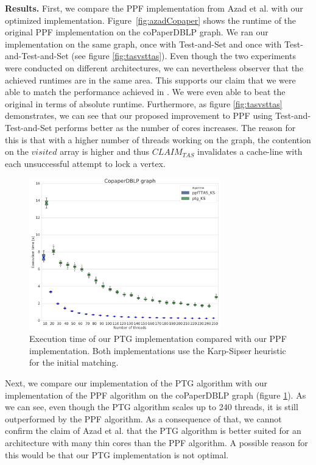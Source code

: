 \documentclass[letterpaper]{article}
\newcommand{\mypar}[1]{{\bf #1.}}
\begin{document}
\mypar{Results} First, we compare the PPF implementation from Azad et al. with our optimized implementation. 
Figure~\ref{fig:azadCopaper} shows the runtime of the original PPF implementation on the coPaperDBLP graph. 
We ran our implementation on the same graph, once with Test-and-Set and once with Test-and-Test-and-Set (see figure \ref{fig:tasvsttas}). 
Even though the two experiments were conducted on different architectures, we can nevertheless observer that the achieved runtimes are in the same area. 
This supports our claim that we were able to match the performance achieved in \cite{Azad:2012}. 
We were even able to beat the original in terms of absolute runtime.
Furthermore, as figure \ref{fig:tasvsttas} demonstrates, we can see that our proposed improvement to PPF using Test-and-Test-and-Set performs 
better as the number of cores increases. The reason for this is that with a higher number of threads working on the graph, 
the contention on the $visited$ array is higher and thus \texttt{$CLAIM_{TAS}$} invalidates a cache-line with each unsuccessful attempt to lock a vertex.\\
 
\begin{figure}\centering
	\includegraphics[width=8.3cm]{../../plot/output/report/coPaperDBLP_TGvsPPFTTAS.png}
	\caption{Execution time of our PTG implementation compared with our PPF implementation. Both implementations use the Karp-Sipser heuristic for the initial matching.}
	\label{fig:tgvsppf}
\end{figure}

Next, we compare our implementation of the PTG algorithm with our implementation of the PPF algorithm on the coPaperDBLP graph (figure \ref{fig:tgvsppf}). As we can see, even though the PTG algorithm scales up to 240 threads, it is still outperformed by the PPF algorithm. As a consequence of that, we cannot confirm the claim of Azad et al. that the PTG algorithm is better suited for an architecture with many thin cores than the PPF algorithm. A possible reason for this would be that our PTG implementation is not optimal.\\
\end{document}
